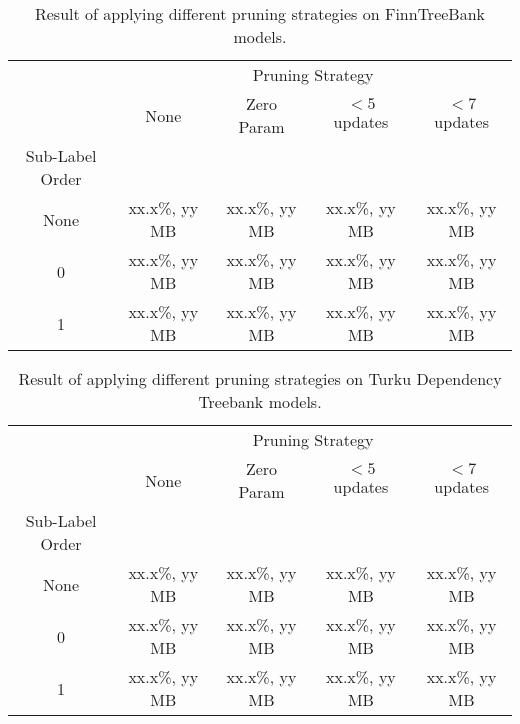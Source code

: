 \begin{table}[htb!]
\begin{center}
\begin{tabular}{ccccc}
                & \multicolumn{4}{c}{Pruning Strategy}\\
                & None           & Zero Param    & $< 5$ updates  & $< 7$ updates  \\
Sub-Label Order &                &               &                &                \\
\hline
None            & xx.x\%, yy MB  & xx.x\%, yy MB  & xx.x\%, yy MB & xx.x\%, yy MB \\
0               & xx.x\%, yy MB  & xx.x\%, yy MB  & xx.x\%, yy MB & xx.x\%, yy MB \\
1               & xx.x\%, yy MB  & xx.x\%, yy MB  & xx.x\%, yy MB & xx.x\%, yy MB \\
\hline
\end{tabular}
\caption{Result of applying different pruning strategies on FinnTreeBank models.}
\end{center}
\end{table}

\begin{table}[htb!]
\begin{center}
\begin{tabular}{ccccc}
                & \multicolumn{4}{c}{Pruning Strategy}\\
                & None           & Zero Param     & $< 5$ updates  & $< 7$ updates  \\
Sub-Label Order &                &                &                &                \\
\hline
None            & xx.x\%, yy MB  & xx.x\%, yy MB  & xx.x\%, yy MB & xx.x\%, yy MB \\
0               & xx.x\%, yy MB  & xx.x\%, yy MB  & xx.x\%, yy MB & xx.x\%, yy MB \\
1               & xx.x\%, yy MB  & xx.x\%, yy MB  & xx.x\%, yy MB & xx.x\%, yy MB \\
\hline
\end{tabular}
\caption{Result of applying different pruning strategies on Turku Dependency Treebank models.}
\end{center}
\end{table}
